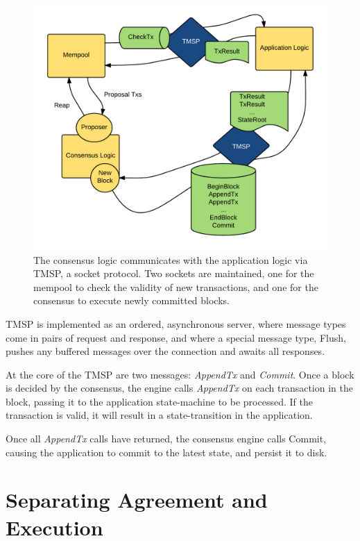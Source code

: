 \begin{figure}[]
	\includegraphics[width=\linewidth,height=\textheight,keepaspectratio]{figures/diagrams/tmsp.png}
    	\centering
	\caption[TMSP Architecture]{
The consensus logic communicates with the application logic via TMSP, a socket protocol. 
Two sockets are maintained, one for the mempool to check the validity of new transactions,
and one for the consensus to execute newly committed blocks.
}
	\label{fig:tmsp}
\end{figure}

TMSP is implemented as an ordered, asynchronous server, 
where message types come in pairs of request and response,
and where a special message type, Flush, pushes any buffered messages over the connection and awaits all responses.

At the core of the TMSP are two messages: \emph{AppendTx} and \emph{Commit}.
Once a block is decided by the consensus, 
the engine calls \emph{AppendTx} on each transaction in the block, 
passing it to the application state-machine to be processed.
If the transaction is valid, it will result in a state-transition in the application.

Once all \emph{AppendTx} calls have returned, the consensus engine calls Commit,
causing the application to commit to the latest state, and persist it to disk.

\section{Separating Agreement and Execution}

